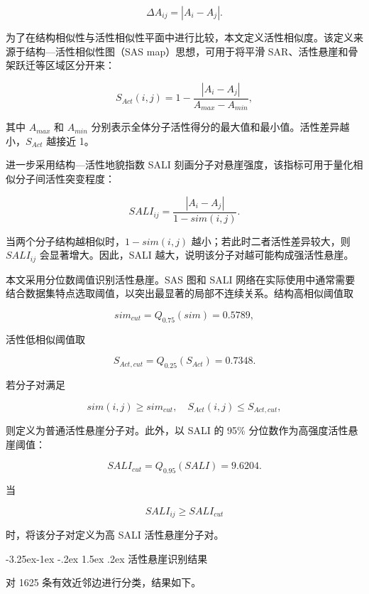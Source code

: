 \documentclass[withoutpreface,bwprint]{cumcmthesis}
\makeatletter
\renewcommand\subsection{\@startsection{subsection}{2}{\z@}%
  {-3.25ex\@plus -1ex \@minus -.2ex}%
  {1.5ex \@plus .2ex}%
  {\normalfont\zihao{-4}\heiti}}
\makeatother
\begin{document}
\[
\Delta A_{ij}=|A_i-A_j|.
\]

为了在结构相似性与活性相似性平面中进行比较，本文定义活性相似度。该定义来源于结构—活性相似性图（SAS map）思想，可用于将平滑 SAR、活性悬崖和骨架跃迁等区域区分开来\cite{ref:guha2012landscape}：

\[
S_{Act}(i,j)=1-\frac{|A_i-A_j|}{A_{max}-A_{min}},
\]

其中 $A_{max}$ 和 $A_{min}$ 分别表示全体分子活性得分的最大值和最小值。活性差异越小，$S_{Act}$ 越接近 1。

进一步采用结构—活性地貌指数 SALI 刻画分子对悬崖强度，该指标可用于量化相似分子间活性突变程度\cite{ref:guha2008sali}：

\[
SALI_{ij}=\frac{|A_i-A_j|}{1-sim(i,j)}.
\]

当两个分子结构越相似时，$1-sim(i,j)$ 越小；若此时二者活性差异较大，则 $SALI_{ij}$ 会显著增大。因此，SALI 越大，说明该分子对越可能构成强活性悬崖。

本文采用分位数阈值识别活性悬崖。SAS 图和 SALI 网络在实际使用中通常需要结合数据集特点选取阈值，以突出最显著的局部不连续关系\cite{ref:guha2012landscape}。结构高相似阈值取

\[
sim_{cut}=Q_{0.75}(sim)=0.5789,
\]

活性低相似阈值取

\[
S_{Act,cut}=Q_{0.25}(S_{Act})=0.7348.
\]

若分子对满足

\[
sim(i,j)\geq sim_{cut},\quad S_{Act}(i,j)\leq S_{Act,cut},
\]

则定义为普通活性悬崖分子对。此外，以 SALI 的 95\% 分位数作为高强度活性悬崖阈值：

\[
SALI_{cut}=Q_{0.95}(SALI)=9.6204.
\]

当

\[
SALI_{ij}\geq SALI_{cut}
\]

时，将该分子对定义为高 SALI 活性悬崖分子对。

\subsection{活性悬崖识别结果}

对 1625 条有效近邻边进行分类，结果如下。

\begin{table}[H]
\centering
\caption{KNN 近邻边的活性悬崖类型统计}
\small
{}
\end{table}
\end{document}

